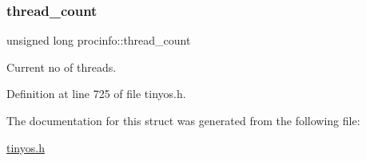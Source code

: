 \subsubsection{\texorpdfstring{thread\+\_\+count}{thread\_count}}
{\footnotesize\ttfamily unsigned long procinfo\+::thread\+\_\+count}

Current no of threads. 

Definition at line 725 of file tinyos.\+h.



The documentation for this struct was generated from the following file\+:\begin{DoxyCompactItemize}
\item 
\hyperlink{tinyos_8h}{tinyos.\+h}\end{DoxyCompactItemize}
